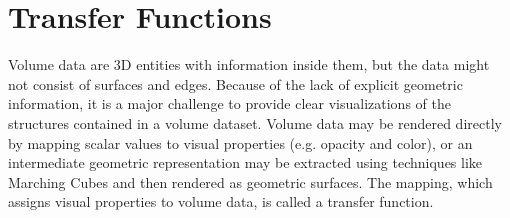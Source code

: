 
\section{Transfer Functions \label{literature_of_transfer_function}}
Volume data are 3D entities with information inside them, but the data might not consist of surfaces and edges.
Because of the lack of explicit geometric information, %
it is a major challenge to provide clear visualizations of the structures contained in a volume dataset.
Volume data may be rendered directly by mapping scalar values to visual properties (e.g. opacity and color), or an intermediate geometric representation may be extracted using techniques like Marching Cubes \cite{lorensen_marching_1987} and then rendered as geometric surfaces. The mapping, which assigns visual properties to volume data, is called a transfer function.

